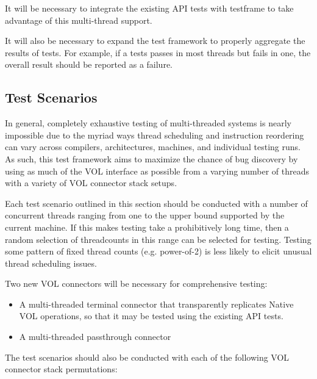 \documentclass{article}
\begin{document}
It will be necessary to integrate the existing API tests with testframe to take advantage of this multi-thread support. 

It will also be necessary to expand the test framework to properly aggregate the results of tests. For example, if a tests passes in most threads but fails in one, the overall result should be reported as a failure.

\subsection{Test Scenarios}
In general, completely exhaustive testing of multi-threaded systems is nearly impossible due to the myriad ways thread scheduling and instruction reordering can vary across compilers, architectures, machines, and individual testing runs. As such, this test framework aims to maximize the chance of bug discovery by using as much of the VOL interface as possible from a varying number of threads with a variety of VOL connector stack setups. 

Each test scenario outlined in this section should be conducted with a number of concurrent threads ranging from one to the upper bound supported by the current machine. If this makes testing take a prohibitively long time, then a random selection of threadcounts in this range can be selected for testing. Testing some pattern of fixed thread counts (e.g. power-of-2) is less likely to elicit unusual thread scheduling issues. 

Two new VOL connectors will be necessary for comprehensive testing:

\begin{itemize}
    \item A multi-threaded terminal connector that transparently replicates Native VOL operations, so that it may be tested using the existing API tests.

    \item A multi-threaded passthrough connector
\end{itemize}

The test scenarios should also be conducted with each of the following VOL connector stack permutations:
\end{document}

